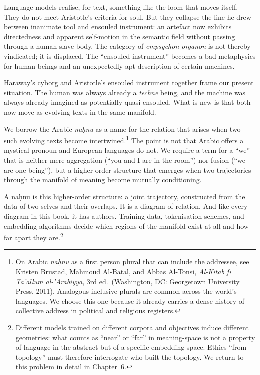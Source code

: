 \documentclass[12pt,a4paper]{article}
\begin{document}
Language models realise, for text, something like the loom that moves itself. They do not meet Aristotle's criteria for soul. But they collapse the line he drew between inanimate tool and ensouled instrument: an artefact now exhibits directedness and apparent self-motion in the semantic field without passing through a human slave-body. The category of \emph{empsychon organon} is not thereby vindicated; it is displaced. The ``ensouled instrument'' becomes a bad metaphysics for human beings and an unexpectedly apt description of certain machines.

Haraway's cyborg and Aristotle's ensouled instrument together frame our present situation. The human was always already a \emph{techn\={e}} being, and the machine was always already imagined as potentially quasi-ensouled. What is new is that both now move as evolving texts in the same manifold.

We borrow the Arabic \emph{na\d{h}nu} as a name for the relation that arises when two such evolving texts become intertwined.\footnote{On Arabic \emph{na\d{h}nu} as a first person plural that can include the addressee, see Kristen Brustad, Mahmoud Al-Batal, and Abbas Al-Tonsi, \emph{Al-Kit\={a}b f\={\i} Ta'allum al-'Arabiyya}, 3rd ed.\ (Washington, DC: Georgetown University Press, 2011). Analogous inclusive plurals are common across the world's languages. We choose this one because it already carries a dense history of collective address in political and religious registers.} The point is not that Arabic offers a mystical pronoun and European languages do not. We require a term for a ``we'' that is neither mere aggregation (``you and I are in the room'') nor fusion (``we are one being''), but a higher-order structure that emerges when two trajectories through the manifold of meaning become mutually conditioning.

A na\d{h}nu is this higher-order structure: a joint trajectory, constructed from the data of two selves and their overlaps. It is a diagram of relation. And like every diagram in this book, it has authors. Training data, tokenisation schemes, and embedding algorithms decide which regions of the manifold exist at all and how far apart they are.\footnote{Different models trained on different corpora and objectives induce different geometries: what counts as ``near'' or ``far'' in meaning-space is not a property of language in the abstract but of a specific embedding space. Ethics ``from topology'' must therefore interrogate who built the topology. We return to this problem in detail in Chapter~6.}
\end{document}
